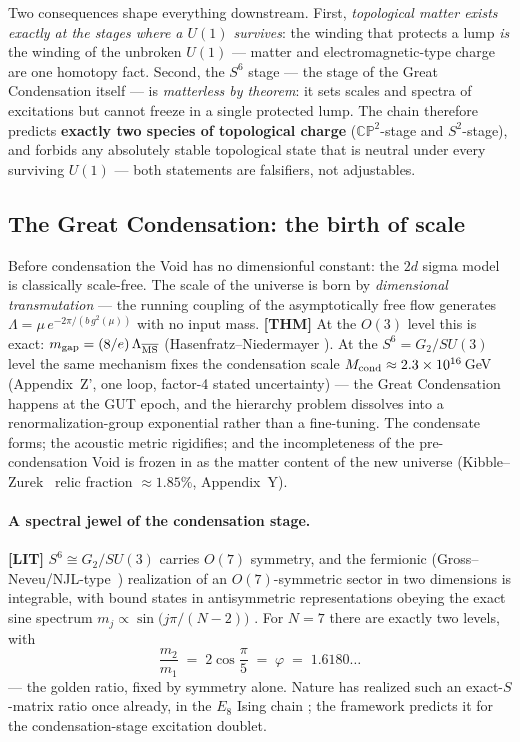 \noindent Two consequences shape everything downstream. First,
\emph{topological matter exists exactly at the stages where a $U(1)$ survives}: the winding
that protects a lump \emph{is} the winding of the unbroken $U(1)$ --- matter and
electromagnetic-type charge are one homotopy fact. Second, the $S^6$ stage --- the stage of
the Great Condensation itself --- is \emph{matterless by theorem}: it sets scales and spectra
of excitations but cannot freeze in a single protected lump. The chain therefore predicts
\textbf{exactly two species of topological charge} ($\mathbb{CP}^2$-stage and $S^2$-stage),
and forbids any absolutely stable topological state that is neutral under every surviving
$U(1)$ --- both statements are falsifiers, not adjustables.

\subsection{The Great Condensation: the birth of scale}
\label{sec:genesis-condensation}

Before condensation the Void has no dimensionful constant: the $2d$ sigma model is classically
scale-free. The scale of the universe is born by \emph{dimensional transmutation} --- the
running coupling of the asymptotically free flow generates
$\Lambda = \mu\, e^{-2\pi/(b\,g^2(\mu))}$ with no input mass. \textbf{[THM]} At the $O(3)$
level this is exact: $m_{\rm gap}=(8/e)\,\Lambda_{\overline{\rm MS}}$
(Hasenfratz--Niedermayer \cite{HN1990}). At the $S^6=G_2/SU(3)$ level the same mechanism
fixes the condensation scale $M_{\rm cond}\approx 2.3\times10^{16}\,$GeV (Appendix~Z',
one loop, factor-4 stated uncertainty) --- the Great Condensation happens at the GUT epoch,
and the hierarchy problem dissolves into a renormalization-group exponential rather than a
fine-tuning. The condensate forms; the acoustic metric rigidifies; and the incompleteness of
the pre-condensation Void is frozen in as the matter content of the new universe
(Kibble--Zurek~\cite{kibble1976,zurek1985} relic fraction $\approx1.85\%$, Appendix~Y).

\paragraph{A spectral jewel of the condensation stage.} \textbf{[LIT]}
$S^6\cong G_2/SU(3)$ carries $O(7)$ symmetry, and the fermionic (Gross--Neveu/NJL-type~\cite{grossneveu1974,njl})
realization of an $O(7)$-symmetric sector in two dimensions is integrable, with bound states
in antisymmetric representations obeying the exact sine spectrum
$m_j \propto \sin\!\big(j\pi/(N{-}2)\big)$ \cite{KarowskiThun1981,GNkinks1995}. For $N=7$
there are exactly two levels, with
\begin{equation}
\frac{m_2}{m_1} \;=\; 2\cos\frac{\pi}{5} \;=\; \varphi \;=\; 1.6180\ldots
\end{equation}
--- the golden ratio, fixed by symmetry alone. Nature has realized such an exact-$S$-matrix
ratio once already, in the $E_8$ Ising chain \cite{Coldea2010}; the framework predicts it for
the condensation-stage excitation doublet.

